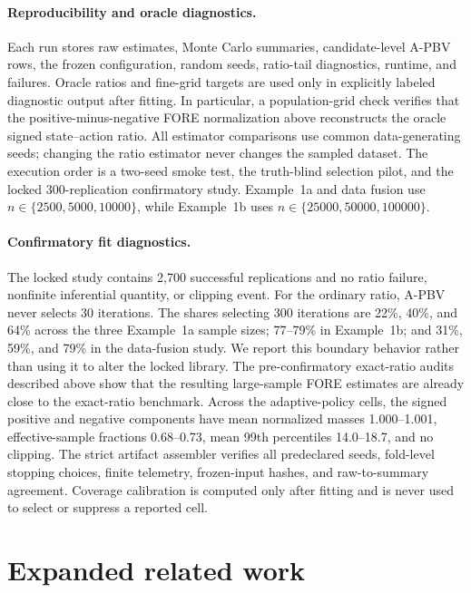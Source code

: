 \documentclass[11pt]{article}
\theoremstyle{plain}
\begin{document}
\paragraph{Reproducibility and oracle diagnostics.}
Each run stores raw estimates, Monte Carlo summaries, candidate-level A-PBV
rows, the frozen configuration, random seeds, ratio-tail diagnostics, runtime,
and failures. Oracle ratios and fine-grid targets are used only in explicitly
labeled diagnostic output after fitting. In particular, a population-grid
check verifies that the positive-minus-negative FORE normalization above
reconstructs the oracle signed state--action ratio. All estimator comparisons
use common data-generating seeds; changing the ratio estimator never changes the
sampled dataset. The execution order is a two-seed smoke test, the truth-blind
selection pilot, and the locked 300-replication confirmatory study. Example~1a
and data fusion use $n\in\{2500,5000,10000\}$, while Example~1b uses
$n\in\{25000,50000,100000\}$.

\paragraph{Confirmatory fit diagnostics.}
The locked study contains 2,700 successful replications and no ratio failure,
nonfinite inferential quantity, or clipping event. For the ordinary ratio,
A-PBV never selects 30 iterations. The shares selecting 300 iterations are
22\%, 40\%, and 64\% across the three Example~1a sample sizes; 77--79\% in
Example~1b; and 31\%, 59\%, and 79\% in the data-fusion study. We report this
boundary behavior rather than using it to alter the locked library. The
pre-confirmatory exact-ratio audits described above show that the resulting
large-sample FORE estimates are already close to the exact-ratio benchmark.
Across the adaptive-policy cells, the signed positive and negative components
have mean normalized masses 1.000--1.001, effective-sample fractions
0.68--0.73, mean 99th percentiles 14.0--18.7, and no clipping. The strict
artifact assembler verifies all predeclared seeds, fold-level stopping choices,
finite telemetry, frozen-input hashes, and raw-to-summary agreement. Coverage
calibration is computed only after fitting and is never used to select or
suppress a reported cell.




 
\section{Expanded related work}
\label{app::relatedwork}
\end{document}
